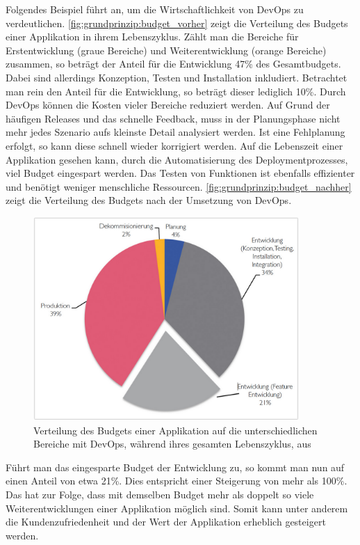 Folgendes Beispiel führt \cite{siprell2014} an, um die Wirtschaftlichkeit von DevOps zu verdeutlichen. \autoref{fig:grundprinzip:budget_vorher} zeigt die Verteilung des Budgets einer Applikation in ihrem Lebenszyklus. Zählt man die Bereiche für Erstentwicklung (graue Bereiche) und Weiterentwicklung (orange Bereiche) zusammen, so beträgt der Anteil für die Entwicklung 47\% des Gesamtbudgets. Dabei sind allerdings Konzeption, Testen und Installation inkludiert. Betrachtet man rein den Anteil für die Entwicklung, so beträgt dieser lediglich 10\%. Durch DevOps können die Kosten vieler Bereiche reduziert werden. Auf Grund der häufigen Releases und das schnelle Feedback, muss in der Planungsphase nicht mehr jedes Szenario aufs kleinste Detail analysiert werden. Ist eine Fehlplanung erfolgt, so kann diese schnell wieder korrigiert werden. Auf die Lebenszeit einer Applikation gesehen kann, durch die Automatisierung des Deploymentprozesses, viel Budget eingespart werden. Das Testen von Funktionen ist ebenfalls effizienter und benötigt weniger menschliche Ressourcen. \autoref{fig:grundprinzip:budget_nachher} zeigt die Verteilung des Budgets nach der Umsetzung von DevOps.

\begin{figure}[ht]
	\centering
	\includegraphics[width=0.9\textwidth]{img/budget_nachher.png}
	\caption[Budgetverteilung einer Applikation mit DevOps, aus \cite{siprell2014}]{Verteilung des Budgets einer Applikation auf die unterschiedlichen Bereiche mit DevOps, während ihres gesamten Lebenszyklus, aus \cite{siprell2014}}
	\label{fig:grundprinzip:budget_nachher}
\end{figure}  

Führt man das eingesparte Budget der Entwicklung zu, so kommt man nun auf einen Anteil von etwa 21\%. Dies entspricht einer Steigerung von mehr als 100\%. Das hat zur Folge, dass mit demselben Budget mehr als doppelt so viele Weiterentwicklungen einer Applikation möglich sind. Somit kann unter anderem die Kundenzufriedenheit und der Wert der Applikation erheblich gesteigert werden.

